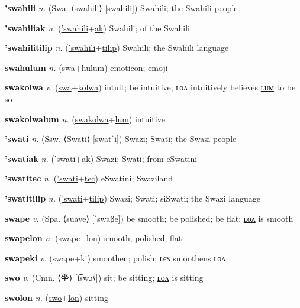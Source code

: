 \textbf{\hypertarget{'swahili}{'swahili}} \textit{n.} (Swa. ⟨swahili⟩ [swahili])
Swahili; the Swahili people

\textbf{\hypertarget{'swahiliak}{'swahiliak}} \textit{n.} (\hyperlink{'swahili}{'swahili}+\allowbreak \hyperlink{ak}{ak})
Swahili; of the Swahili

\textbf{\hypertarget{'swahilitilip}{'swahilitilip}} \textit{n.} (\hyperlink{'swahili}{'swahili}+\allowbreak \hyperlink{tilip}{tilip})
Swahili; the Swahili language

\textbf{\hypertarget{swahulum}{swahulum}} \textit{n.} (\hyperlink{swa}{swa}+\allowbreak \hyperlink{hulum}{hulum})
emoticon; emoji

\textbf{\hypertarget{swakolwa}{swakolwa}} \textit{v.} (\hyperlink{swa}{swa}+\allowbreak \hyperlink{kolwa}{kolwa})
intuit; be intuitive; ʟᴏᴧ intuitively believes \hyperlink{swakolwalum}{ʟᴜᴍ} to be so

\textbf{\hypertarget{swakolwalum}{swakolwalum}} \textit{n.} (\hyperlink{swakolwa}{swakolwa}+\allowbreak \hyperlink{lum}{lum})
intuitive

\textbf{\hypertarget{'swati}{'swati}} \textit{n.} (Ssw. ⟨Swati⟩ [swatˈi])
Swazi; Swati; the Swazi people

\textbf{\hypertarget{'swatiak}{'swatiak}} \textit{n.} (\hyperlink{'swati}{'swati}+\allowbreak \hyperlink{ak}{ak})
Swazi; Swati; from eSwatini

\textbf{\hypertarget{'swatitec}{'swatitec}} \textit{n.} (\hyperlink{'swati}{'swati}+\allowbreak \hyperlink{tec}{tec})
eSwatini; Swaziland

\textbf{\hypertarget{'swatitilip}{'swatitilip}} \textit{n.} (\hyperlink{'swati}{'swati}+\allowbreak \hyperlink{tilip}{tilip})
Swazi; Swati; siSwati; the Swazi language

\textbf{\hypertarget{swape}{swape}} \textit{v.} (Spa. ⟨suave⟩ [ˈswaβe])
be smooth; be polished; be flat; \hyperlink{swapelon}{ʟᴏᴧ} is smooth

\textbf{\hypertarget{swapelon}{swapelon}} \textit{n.} (\hyperlink{swape}{swape}+\allowbreak \hyperlink{lon}{lon})
smooth; polished; flat

\textbf{\hypertarget{swapeki}{swapeki}} \textit{v.} (\hyperlink{swape}{swape}+\allowbreak \hyperlink{ki}{ki})
smoothen; polish; ʟєꜱ smoothens ʟᴏᴧ

\textbf{\hypertarget{swo}{swo}} \textit{v.} (Cmn. ⟨{\chinese{}坐}⟩ [t͡swɔ˥˩])
sit; be sitting; \hyperlink{swolon}{ʟᴏᴧ} is sitting

\textbf{\hypertarget{swolon}{swolon}} \textit{n.} (\hyperlink{swo}{swo}+\allowbreak \hyperlink{lon}{lon})
sitting


